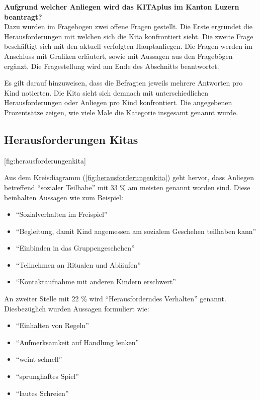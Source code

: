 \documentclass[
  ngerman,
  11pt,
  paper=a4,
  twoside,
  titlepage=true,
  openright,
  abstract=on,
  toc=listofnumbered,
  numbers=noenddot,
  chapterprefix=true,
  headings=optiontohead,
  svgnames,
  dvipsnames]{scrreprt}
\providecommand{\tightlist}{%
  \setlength{\itemsep}{0pt}\setlength{\parskip}{0pt}}
\begin{document}
\textbf{Aufgrund welcher Anliegen wird das KITAplus im Kanton Luzern
beantragt?}\\
Dazu wurden im Fragebogen zwei offene Fragen gestellt. Die Erste
ergründet die Herausforderungen mit welchen sich die Kita konfrontiert
sieht. Die zweite Frage beschäftigt sich mit den aktuell verfolgten
Hauptanliegen. Die Fragen werden im Anschluss mit Grafiken erläutert,
sowie mit Aussagen aus den Fragebögen ergänzt. Die Fragestellung wird am
Ende des Abschnitts beantwortet.

Es gilt darauf hinzuweisen, dass die Befragten jeweils mehrere Antworten
pro Kind notierten. Die Kita sieht sich demnach mit unterschiedlichen
Herausforderungen oder Anliegen pro Kind konfrontiert. Die angegebenen
Prozentsätze zeigen, wie viele Male die Kategorie insgesamt genannt
wurde.

\hypertarget{herausforderungen-kitas}{%
\subsection{Herausforderungen Kitas}\label{herausforderungen-kitas}}

[fig:herausforderungenkita]

Aus dem Kreisdiagramm (\cref{fig:herausforderungenkita}) geht hervor,
dass Anliegen betreffend “sozialer Teilhabe” mit 33 \% am meisten
genannt worden sind. Diese beinhalten Aussagen wie zum Beispiel:

\begin{itemize}
\tightlist
\item
  “Sozialverhalten im Freispiel”
\item
  “Begleitung, damit Kind angemessen am sozialem Geschehen teilhaben
  kann”
\item
  “Einbinden in das Gruppengeschehen”
\item
  “Teilnehmen an Ritualen und Abläufen”
\item
  “Kontaktaufnahme mit anderen Kindern erschwert”
\end{itemize}

An zweiter Stelle mit 22 \% wird “Herausforderndes Verhalten” genannt.
Diesbezüglich wurden Aussagen formuliert wie:

\begin{itemize}
\tightlist
\item
  “Einhalten von Regeln”
\item
  “Aufmerksamkeit auf Handlung lenken”
\item
  “weint schnell”
\item
  “sprunghaftes Spiel”
\item
  “lautes Schreien”
\end{itemize}
\end{document}
